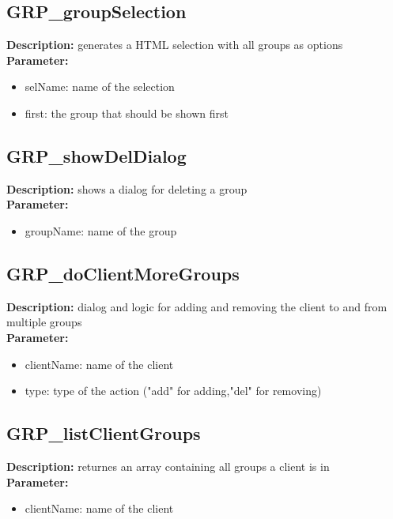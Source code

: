 \subsection{GRP\_groupSelection}
\textbf{Description:} generates a HTML selection with all groups as options\\
\textbf{Parameter:}
\begin{itemize}
\item selName: name of the selection
\item first: the group that should be shown first
\end{itemize}

\subsection{GRP\_showDelDialog}
\textbf{Description:} shows a dialog for deleting a group\\
\textbf{Parameter:}
\begin{itemize}
\item groupName: name of the group
\end{itemize}

\subsection{GRP\_doClientMoreGroups}
\textbf{Description:} dialog and logic for adding and removing the client to and from multiple groups\\
\textbf{Parameter:}
\begin{itemize}
\item clientName: name of the client
\item type: type of the action ("add" for adding,"del" for removing)
\end{itemize}

\subsection{GRP\_listClientGroups}
\textbf{Description:} returnes an array containing all groups a client is in\\
\textbf{Parameter:}
\begin{itemize}
\item clientName: name of the client
\end{itemize}


